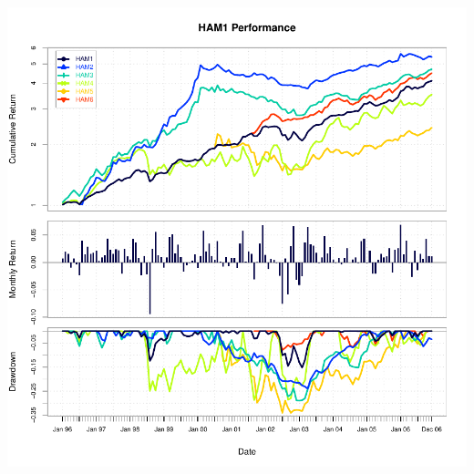 \documentclass[12pt,letterpaper,english]{article}
\begin{document}
\includegraphics{Managers-011}
\end{document}
